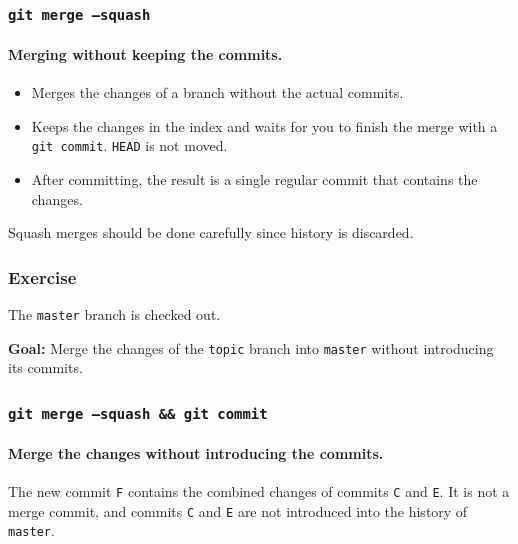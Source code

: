 \documentclass{beamer}
\newcommand\gitcmd[1]{\texttt{git #1}}
\newcommand\grefspec[1]{\texttt{#1}}
\newcommand\gbranch[1]{\texttt{#1}}
\newcommand\gHEAD{\texttt{HEAD}}
\newcommand\goal[1]{\textbf{Goal:} #1}
\begin{document}
\begin{frame}
  \frametitle{\gitcmd{merge --squash}}
  \framesubtitle{Merging without keeping the commits.}

  \begin{itemize}
    \item Merges the changes of a branch without the actual commits.
    \item Keeps the changes in the index and waits for you to finish the merge with a \gitcmd{commit}. \gHEAD{} is not moved.
    \item After committing, the result is a single regular commit that contains the changes.
  \end{itemize}

  Squash merges should be done carefully since history is discarded.
\end{frame}

\begin{frame}
  \frametitle{Exercise}

  The \gbranch{master} branch is checked out.

  \goal{Merge the changes of the \gbranch{topic} branch into \gbranch{master} without introducing its commits.}

  \begin{figure}
    \centering
  \end{figure}
\end{frame}

\begin{frame}
  \frametitle{\texttt{\gitcmd{merge --squash} \&\& \gitcmd{commit}}}
  \framesubtitle{Merge the changes without introducing the commits.}

  \begin{figure}
    \centering
  \end{figure}

  The new commit \grefspec{F} contains the combined changes of commits \grefspec{C} and \grefspec{E}.
  It is not a merge commit, and commits \grefspec{C} and \grefspec{E} are not introduced into the history of \gbranch{master}.
\end{frame}
\end{document}
